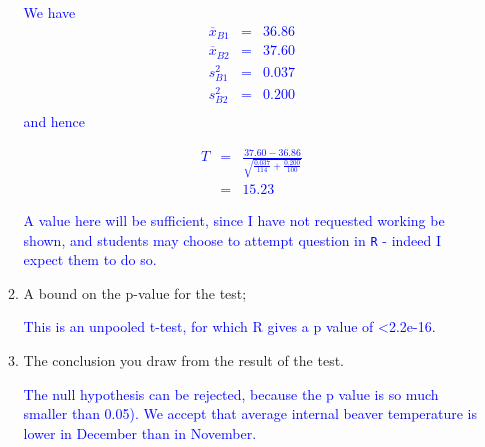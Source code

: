 \documentclass[11pt,a4paper]{article}
\begin{document}
\begin{enumerate}
\begin{enumerate}
\textcolor{blue}{We have}
\textcolor{blue}{
\begin{eqnarray*}
\overline{x}_{B1}&=&36.86\\
\overline{x}_{B2}&=&37.60\\
s^2_{B1}&=&0.037\\
s^2_{B2}&=&0.200\\
\end{eqnarray*}
}
\textcolor{blue}{and hence}

\textcolor{blue}{
\begin{eqnarray*}
T&=&\frac{37.60-36.86}{\sqrt{\frac{0.037}{114}+\frac{0.200}{100}}}\\
&=& 15.23
\end{eqnarray*}
}

\textcolor{blue}{A value here will be sufficient, since I have not requested working be shown, and students may choose to attempt question in \texttt{R} - indeed I expect them to do so.}
 


\item A bound on the p-value for the test;

\textcolor{blue}{This is an unpooled t-test, for which R gives a p value of <2.2e-16.}

 

\item The conclusion you draw from the result of the test.

\textcolor{blue}{The null hypothesis can be rejected, because the p value is so much smaller than 0.05). We accept that average internal beaver temperature is lower in December than in November.}
 

\end{enumerate}
\end{enumerate}
\end{document}
